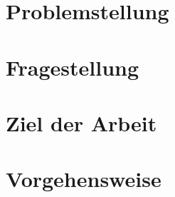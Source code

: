 
\section[Problemstellung]{Problemstellung}
\label{anhang_expose:problemstellung}

\section[Fragestellung]{Fragestellung}
\label{anhang_expose:fragestellung}

\section[Ziel der Arbeit]{Ziel der Arbeit}
\label{anhang_expose:arbeitsziel}


\section[Vorgehensweise]{Vorgehensweise}
\label{anhang_expose:vorgehensweise}
